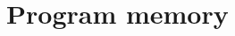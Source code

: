 \hypertarget{group__group__mega__utils__progmem}{\section{Program memory}
\label{group__group__mega__utils__progmem}
}
